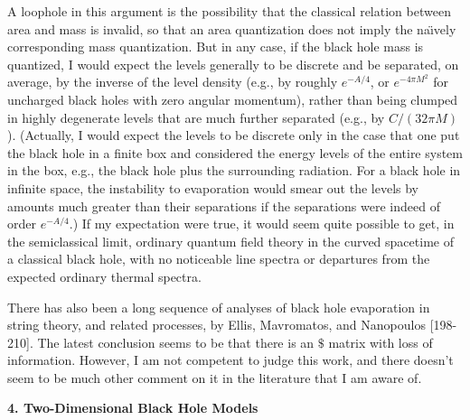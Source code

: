      A loophole in this argument is the possibility that the
classical relation
between area and mass is invalid, so that an area quantization does
not
imply the na\"{\i}vely corresponding mass quantization.  But in any
case,
if the black hole mass is quantized,
I would expect the levels generally to be discrete and be separated,
on
average, by the inverse of the level density (e.g., by roughly
$e^{-A/4}$,
or $e^{-4\pi M^2}$ for uncharged black holes with zero angular
momentum),
rather than being clumped in highly degenerate levels that are much
further
separated (e.g., by $C/(32\pi M)$).  (Actually, I would expect the
levels
to be discrete only in the case that one put the black hole in a
finite box and
considered the energy levels of the entire system in the box, e.g.,
the
black hole plus the surrounding radiation.  For a black hole in
infinite space,
the instability to evaporation would smear out the levels by amounts
much greater than their separations if the separations were indeed of
order
$e^{-A/4}$.)  If my expectation were true, it would seem quite
possible to
get, in the semiclassical limit, ordinary quantum field theory in the
curved
spacetime of a classical black hole, with no noticeable line spectra
or
departures from the expected ordinary thermal spectra.

     There has also been a long sequence of analyses of black hole
evaporation
in string theory, and related processes, by Ellis, Mavromatos, and
Nanopoulos
[198-210].
The latest conclusion seems to be \cite{EMN13} that there is an $\$$
matrix
with loss of information.  However, I am not competent to judge this
work,
and there doesn't seem to be much other comment on it in the
literature that
I am aware of.

\vspace{5 mm}
{\bf 4.  Two-Dimensional Black Hole Models}
\vspace{5 mm}

